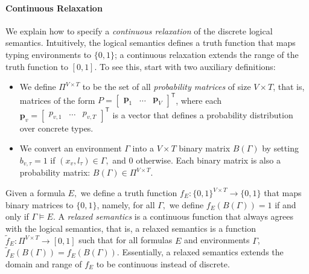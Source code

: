 \documentclass[acmsmall,nonacm]{acmart}\settopmatter{printfolios=true,printccs=false,printacmref=false}
\begin{document}
\paragraph{Continuous Relaxation}
We explain how to specify a \emph{continuous relaxation} of the discrete logical semantics. Intuitively, the logical semantics defines a truth function that maps typing environments to $\{0, 1\}$; a continuous
relaxation extends the range of the truth function to $[0, 1].$
To see this, start with two auxiliary definitions:
\begin{itemize}
    \item We define $\Pi^{V \times T}$ to be the set
of all \emph{probability matrices} of size $V \times T$,
that is, matrices of the form $P = \begin{bmatrix} \bm{p}_1 & \ldots & \bm{p}_{V} \end{bmatrix}^\mathsf{T}$,
where each $\bm{p}_v = \begin{bmatrix} p_{v,1} & \ldots & p_{v,{T}} \end{bmatrix}^\mathsf{T}$
is a vector that defines a probability distribution over concrete types.
    \item We convert an environment $\Gamma$ into a $V \times T$ binary matrix $B(\Gamma)$ by setting $b_{v,\tau} = 1$ if $(x_v, l_\tau) \in \Gamma,$ and 0 otherwise.
    Each binary matrix is also a probability matrix: $B(\Gamma) \in \Pi^{V \times T}$.
\end{itemize}
Given a formula $E,$ we define a truth function $f_E: \{0, 1\}^{V \times T} \rightarrow \{0, 1\}$
that maps binary matrices to $\{0, 1\}$, namely, for all $\Gamma,$ we define $f_{E}(B(\Gamma)) = 1$ if and only if $\Gamma \models E$.
A \emph{relaxed semantics} is a continuous function
that always agrees with the logical semantics, that is,
a relaxed semantics is a function
$\tilde{f}_{E} : \Pi^{V \times T}  \rightarrow [0, 1]$
such that for all formulas $E$ and environments $\Gamma$,
$\tilde{f}_{E}(B(\Gamma)) = f_E(B(\Gamma))$.
Essentially, a relaxed semantics extends the domain and range
of $f_E$ to be continuous instead of discrete.

\end{document}
